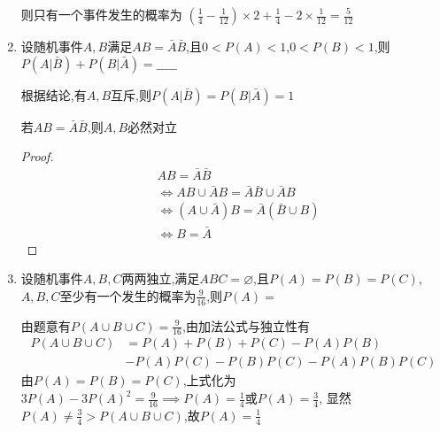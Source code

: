 \documentclass[12pt, a4paper, oneside, UTF8]{ctexbook}
\begin{document}
\begin{enumerate}[label=\arabic*.]
\begin{solution}
\begin{center}
    \end{center}
    则只有一个事件发生的概率为
        $(\frac{1}{4} - \frac{1}{12})\times 2 + \frac{1}{4} 
        - 2\times \frac{1}{12} = \frac{5}{12}$
    \end{solution}
    
    \item 设随机事件$A,B$满足$AB=\bar{A}\bar{B}$,且$0<P(A)<1$,$0<P(B)<1$,则$P(A|\bar{B})+P(B|\bar{A})=\_\_\_\_\_$
    
    \begin{solution}
    \color{blue}
    根据结论,有$A,B$互斥,则$P(A|\bar{B})=P(B|\bar{A})=1$
    \end{solution}

    \begin{corollary}
        若$AB=\bar{A}\bar{B}$,则$A,B$必然对立
        \begin{proof}
            \begin{align*}
                &AB =\bar{A}\bar{B} \\
                &\iff AB\cup \bar{A}B =\bar{A}\bar{B}\cup \bar{A}B \\
                &\iff (A\cup \bar{A})B = \bar{A}(\bar{B}\cup B) \\
                &\iff B = \bar{A}
            \end{align*}
        \end{proof}
    \end{corollary}

    \item 设随机事件$A,B,C$两两独立,满足$ABC=\varnothing$,且$P(A)=P(B)=P(C)$,$A,B,C$至少有一个发生的概率为$\frac{9}{16}$,则$P(A)=$
    
    \begin{solution}
    \color{blue}
    由题意有$P(A\cup B\cup C) = \frac{9}{16}$,由加法公式与独立性有
    \begin{align*}
        P(A\cup B\cup C) 
        &= P(A) + P(B) + P(C) - P(A)P(B) \\
        &- P(A)P(C) - P(B)P(C) - P(A)P(B)P(C)
    \end{align*}
    由$P(A)=P(B)=P(C)$,上式化为$3P(A)-3P(A)^2 = \frac{9}{16}\implies P(A)=\frac{1}{4}\text{或}P(A)=\frac{3}{4}$,
    显然$P(A)\neq \frac{3}{4} > P(A\cup B\cup C)$,故$P(A)=\frac{1}{4}$
    \end{solution}
    

\end{enumerate}
\end{document}
